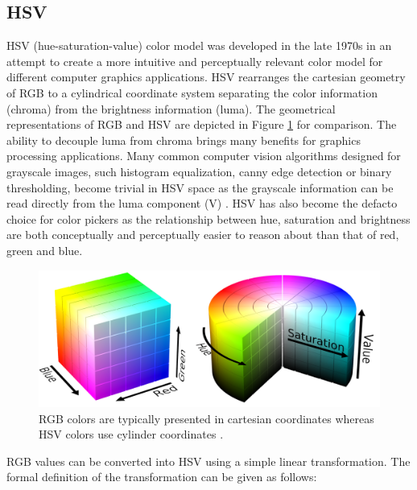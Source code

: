\documentclass[thesis.tex]{subfiles}
\begin{document}
\subsection{HSV}

HSV (hue-saturation-value) color model was developed in the late 1970s in an attempt to create a more intuitive and perceptually relevant color model for different computer graphics applications. HSV rearranges the cartesian geometry of RGB to a cylindrical coordinate system separating the color information (chroma) from the brightness information (luma). The geometrical representations of RGB and HSV are depicted in Figure \ref{figure:rgb_hsv} for comparison. The ability to decouple luma from chroma brings many benefits for graphics processing applications. Many common computer vision algorithms designed for grayscale images, such histogram equalization, canny edge detection or binary thresholding, become trivial in HSV space as the grayscale information can be read directly from the luma component (V) \cite{color_segmentation}. HSV has also become the defacto choice for color pickers as the relationship between hue, saturation and brightness are both conceptually and perceptually easier to reason about than that of red, green and blue.

\begin{figure}[hb]
\centering \includegraphics[width=\textwidth]{images/rgb_hsv}
\caption{RGB colors are typically presented in cartesian coordinates whereas HSV colors use cylinder coordinates \cite{hsv_cylinder}\cite{rgb_cube}.\label{figure:rgb_hsv}}
\end{figure}

RGB values can be converted into HSV using a simple linear transformation. The formal definition of the transformation can be given as follows:
\end{document}
